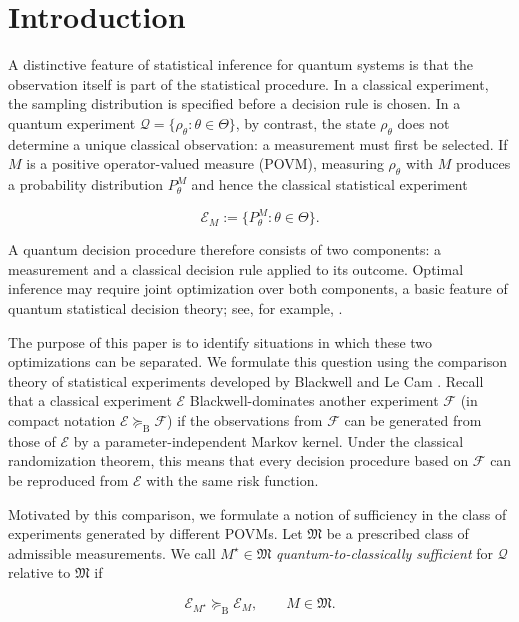 \documentclass{article}
\theoremstyle{named}
\theoremstyle{named1}
\theoremstyle{plain}
\theoremstyle{remark}
\begin{document}
\newpage

\section{Introduction}

A distinctive feature of statistical inference for quantum systems is that the
observation itself is part of the statistical procedure. In a classical
experiment, the sampling distribution is specified before a decision rule is
chosen. In a quantum experiment
$\mathcal Q=\{\rho_\theta:\theta\in\Theta\}$, by contrast, the state
$\rho_\theta$ does not determine a unique classical observation: a
measurement must first be selected. If $M$ is a positive operator-valued
measure (POVM), measuring $\rho_\theta$ with $M$ produces a probability
distribution $P_\theta^M$ and hence the classical statistical experiment

$$
    \mathcal E_M
    :=
    \{P_\theta^M:\theta\in\Theta\}.
$$

A quantum decision procedure therefore consists of two components: a
measurement and a classical decision rule applied to its outcome. Optimal
inference may require joint optimization over both components, a basic feature
of quantum statistical decision theory; see, for example,
\cite{Helstrom,Holevo2011}.

The purpose of this paper is to identify situations in which these two
optimizations can be separated. We formulate this question using the
comparison theory of statistical experiments developed by Blackwell and
Le Cam
\cite{Blackwell1951,Blackwell1953,LeCam1964,LeCam1996,LeCam1986,Torgersen1991}.
Recall that a classical experiment $\mathcal E$ Blackwell-dominates another
experiment $\mathcal F$ (in compact notation $\mathcal E
    \succeq_{\mathrm B}
    \mathcal F$) if the observations from $\mathcal F$ can be
generated from those of $\mathcal E$ by a parameter-independent Markov
kernel. Under the classical randomization theorem, this means that every
decision procedure based on $\mathcal F$ can be reproduced from
$\mathcal E$ with the same risk function.

Motivated by this comparison, we formulate a notion of sufficiency in the class of experiments generated by different POVMs. Let $\mathfrak M$ be a prescribed class of
admissible measurements. We call $M^\star\in\mathfrak M$
\emph{quantum-to-classically sufficient} for $\mathcal Q$ relative to
$\mathfrak M$ if

$$
    \mathcal E_{M^\star}
    \succeq_{\mathrm B}
    \mathcal E_M,
    \qquad
    M\in\mathfrak M.
$$
\end{document}
